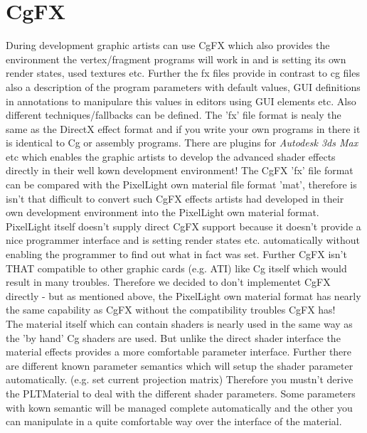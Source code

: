 \section{CgFX}
During development graphic artists can use CgFX which also provides the environment the vertex/fragment
programs will work in and is setting its own render states, used textures etc. Further the fx files
provide in contrast to cg files also a description of the program parameters with default values, \ac{GUI}
definitions in annotations to manipulare this values in editors using \ac{GUI} elements etc.
Also different techniques/fallbacks can be defined. The 'fx' file format is nealy the same as the
DirectX effect format and if you write your own programs in there it is identical to Cg or assembly
programs. There are plugins for \emph{Autodesk 3ds Max} etc which enables the graphic artists to develop the
advanced shader effects directly in their well kown development environment! The CgFX 'fx' file format
can be compared with the PixelLight own material file format 'mat', therefore is isn't that difficult to 
convert such CgFX effects artists had developed in their own development environment into the
PixelLight own material format.\\

PixelLight itself doesn't supply direct CgFX support because it doesn't provide a nice programmer
interface and is setting render states etc. automatically without enabling the programmer to find
out what in fact was set. Further CgFX isn't THAT compatible to other graphic cards (e.g. ATI) like
Cg itself which would result in many troubles. Therefore we decided to don't implementet CgFX directly
- but as mentioned above, the PixelLight own material format has nearly the same capability as CgFX
without the compatibility troubles CgFX has!\\

The material itself which can contain shaders is nearly used in the same way as the 'by hand' Cg shaders
are used. But unlike the direct shader interface the material effects provides a more comfortable
parameter interface. Further there are different known parameter semantics which will setup the
shader parameter automatically. (e.g. set current projection matrix) Therefore you mustn't derive
the PLTMaterial to deal with the different shader parameters. Some parameters with kown semantic
will be managed complete automatically and the other you can manipulate in a quite comfortable way
over the interface of the material.\\




